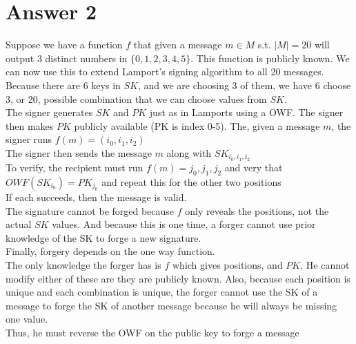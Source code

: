 \documentclass[11pt]{article}
\theoremstyle{definition}
\begin{document}
\section*{Answer 2}
Suppose we have a function $f$ that given a message $m \in M$ s.t. $|M| = 20$ will output 3 distinct numbers in $\{0,1,2,3,4,5\}$.  This function is publicly known.  We can now use this to extend Lamport's signing algorithm to all 20 messages.  Because there are $6$ keys in $SK$, and we are choosing 3 of them, we have 6 choose 3, or 20, possible combination that we can choose values from $SK$.\\  
\newline
The signer generates $SK$ and $PK$ just as in Lamports using a OWF.  The signer then makes $PK$ publicly available (PK is index 0-5).  The, given a message $m$, the signer runs $f(m) = (i_0,i_1,i_2)$\\
The signer then sends the message $m$ along with $SK_{i_0,i_1,i_2}$\\
To verify, the recipient must run $f(m) = j_0,j_1,j_2$ and very that $OWF(SK_{i_0}) = PK_{j_0}$ and repeat this for the other two positions\\
If each succeeds, then the message is valid.\\
The signature cannot be forged because $f$ only reveals the positions, not the actual $SK$ values.  And because this is one time, a forger cannot use prior knowledge of the SK to forge a new signature.\\
Finally, forgery depends on the one way function.\\
The only knowledge the forger has is $f$ which gives positions, and $PK$.  He cannot modify either of these are they are publicly known.  Also, because each position is unique and each combination is unique, the forger cannot use the SK of a message to forge the SK of another message because he will always be missing one value.\\
Thus, he must reverse the OWF on the public key to forge a message\\
\end{document}
